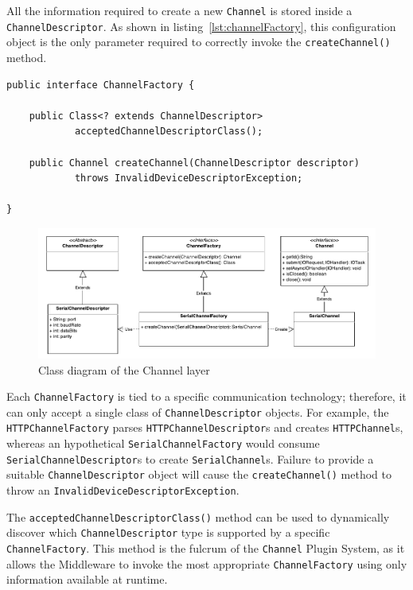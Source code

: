 All the information required to create a new \texttt{Channel} is stored inside a \texttt{ChannelDescriptor}. As shown in listing~\ref{lst:channelFactory}, this configuration object is the only parameter required to correctly invoke the \texttt{createChannel()} method.

\lstset{language=Java}
\begin{lstlisting}[float,caption=The ChannelFactory interface,label={lst:channelFactory}]
public interface ChannelFactory {

	public Class<? extends ChannelDescriptor>
			acceptedChannelDescriptorClass();

	public Channel createChannel(ChannelDescriptor descriptor)
			throws InvalidDeviceDescriptorException;

}
\end{lstlisting}

\begin{figure}[h!]
\includegraphics[width=\textwidth]{imgs/channel_factory.pdf}
\caption{Class diagram of the Channel layer}
\end{figure}

Each \texttt{ChannelFactory} is tied to a specific communication technology; therefore, it can only accept a single class of \texttt{ChannelDescriptor} objects. For example, the \texttt{HTTPChannelFactory} parses \texttt{HTTPChannelDescriptor}s and creates \texttt{HTTPChannel}s, whereas an hypothetical \texttt{SerialChannelFactory} would consume \texttt{SerialChannelDescriptor}s to create \texttt{SerialChannel}s. Failure to provide a suitable \texttt{ChannelDescriptor} object will cause the \texttt{createChannel()} method to throw an \texttt{InvalidDeviceDescriptorException}.

The \texttt{acceptedChannelDescriptorClass()} method can be used to dynamically discover which \texttt{ChannelDescriptor} type is supported by a specific \texttt{ChannelFactory}. This method is the fulcrum of the \texttt{Channel} Plugin System, as it allows the Middleware to invoke the most appropriate \texttt{ChannelFactory} using only information available at runtime.

